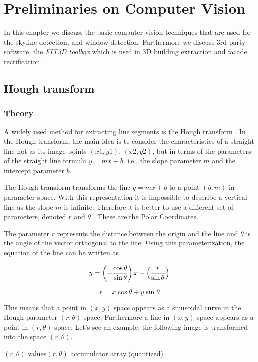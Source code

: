 \section{Preliminaries on Computer Vision}
\label{sec:ch2}
In this chapter we discuss the basic computer vision techniques that are used for
the skyline detection, and window detection.  Furthermore we discuss 3rd
party software, the \emph{FIT3D toolbox} \cite{FIT3D} which is used in 3D building extraction and facade rectification.

\subsection{Hough transform}
\label{sec:prelimHough}
\subsubsection{Theory}
	A widely used method for extracting line segments is the Hough transform
	\cite{Hough}.
	In the Hough transform, the main idea is to consider the characteristics of a
	straight line not as its image points $(x1, y1)$, $(x2, y2)$, but in
	terms of the parameters of the straight line formula $y = mx + b$. i.e., the
	slope parameter $m$ and the intercept parameter $b$.


	The Hough transform transforms the line $y = mx + b$ 
	to a point $(b,m)$ in parameter space.
	With this representation it is impossible to describe a vertical line as 
	the slope $m$ is infinite.
	Therefore it is better to use a different set of parameters, denoted $r$ and $\theta$ .  These are the Polar Coordinates.

	The parameter $r$ represents the distance between the origin and the line  and $\theta$ is the angle of the vector orthogonal to the line.
	Using this parameterization, the equation of the line can be written as

\[	    y = \left(-{\cos\theta\over\sin\theta}\right)x + \left({r\over{\sin\theta}}\right) \]

	\[r = x \cos \theta+y\sin \theta \]
	
	This means that a point in $(x,y)$ space appears as a sinusoidal
	curve in the Hough parameter $(r,\theta)$ space.  Furthermore a line in
	$(x,y)$ space appears as a point in $(r,\theta)$ space. Let's see an example, the
	following image is transformed into the space $(r,\theta)$.
	
	 {$(r, \theta)$ values}{$(r, \theta)$ accumulator array (quantized)}

